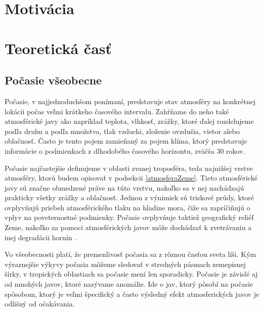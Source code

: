 
\section{Motivácia}

\section{Teoretická časť}

\subsection{Počasie všeobecne}
Počasie, v najjednoduchšom ponímaní, predstavuje stav atmosféry na konkrétnej lokácii počas veľmi krátkeho časového intervalu. Zahŕňame do neho také atmosférické javy ako napríklad teplota, vlhkosť, zrážky, ktoré ďalej rozdelujeme podľa druhu a podľa množstva, tlak vzduchi, zloženie ovzdušia, vietor alebo oblačnosť. Často je tento pojem zamieňaný za pojem klíma, ktorý predstavuje informácie o podmienkach z dlhodobého časového horizontu, zväčša 30 rokov.

Počasie najčastejšie definujeme v oblasti zvanej troposféra, teda najnižšej vrstve atmosféry, ktorú budem opisovať v podsekcii \ref{atmosferaZeme}. Tieto atmosférické javy sú značne obmedzené práve na túto vrstvu, nakoľko sa v nej nachádzajú prakticky všetky zrážky a oblačnosť. Jednou z výnimiek sú triskové prúdy, ktoré ovplyvňujú priebeh atmosférického tlaku na hladine mora, čiže sa zapríčiňujú o vplyv na poveternostné podmienky. Počasie ovplyvňuje taktiež geografický reliéf Zeme, nakoľko za pomoci atmosférických javov môže dochádzať k zvetrávaniu a inej degradácii hornín \cite{meteo}. 

Vo všeobecnosti platí, že premenlivosť počasia sa z rôznou časťou sveta líši. Kým výraznejšie výkyvy počasia môžeme sledovať v stredných pásmach zemepisnej šírky, v tropických oblastiach sa počasie mení len sporadicky. Počasie je závislé aj od mnohých javov, ktoré nazývame anomálie. Ide o jav, ktorý pôsobí na počasie spôsobom, ktorý je veľmi špecifický a často výsledný efekt atmosferických javov je odlišný od očakávania. 

